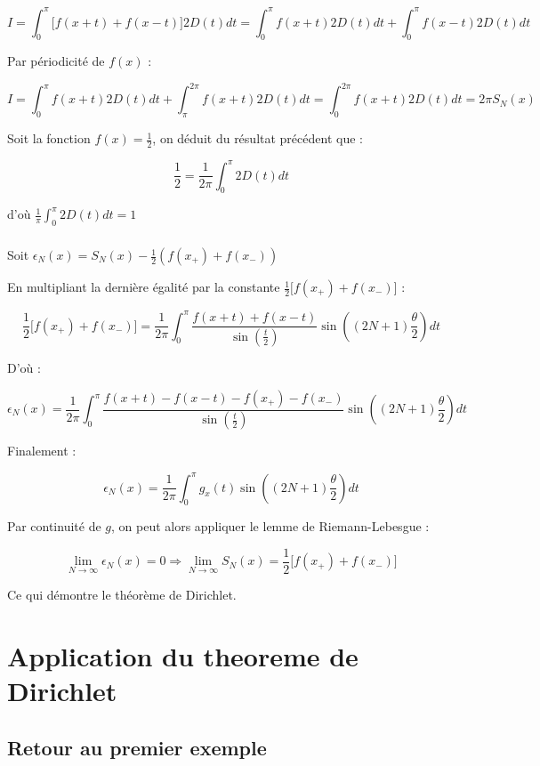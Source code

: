\documentclass{article}
\begin{document}
$$I = \int_{0}^{\pi} \Big[f(x + t) + f(x - t)\Big] 2D(t) dt = \int_{0}^{\pi} f(x + t) 2D(t) dt
+ \int_{0}^{\pi} f(x - t) 2D(t) dt$$

Par périodicité de $f(x)$ :

$$I = \int_{0}^{\pi} f(x + t) 2D(t) dt + \int_{\pi}^{2\pi} f(x + t) 2D(t) dt =
\int_{0}^{2\pi} f(x + t) 2D(t) dt = 2\pi S_N(x)$$ 

Soit la fonction $f(x) = \frac{1}{2}$, on déduit du résultat précédent que :

$$\frac{1}{2} = \frac{1}{2\pi} \int_{0}^{\pi} 2 D(t) dt$$

d'où $\frac{1}{\pi} \int_{0}^{\pi} 2 D(t) dt = 1$

\subsubsection{}

Soit $\epsilon_N(x) = S_N(x) - \frac{1}{2}(f(x_{+}) + f(x_{-}))$

En multipliant la dernière égalité par la constante $\frac{1}{2}\Big[f(x_{+}) + f(x_{-})\Big]$ :

$$\frac{1}{2}\Big[f(x_{+}) + f(x_{-})\Big] =
\frac{1}{2\pi} \int_{0}^{\pi} \frac{f(x + t) + f(x - t)}{\sin(\frac{t}{2})} \sin((2N + 1)\frac{\theta}{2}) dt$$


D'où :

$$\epsilon_N(x) = \frac{1}{2\pi} \int_{0}^{\pi} 
\frac{f(x + t) - f(x - t) - f(x_{+}) - f(x_{-})}{\sin(\frac{t}{2})} \sin((2N + 1)\frac{\theta}{2}) dt$$

Finalement :

$$\epsilon_N(x) = \frac{1}{2\pi} \int_{0}^{\pi} g_{x}(t) \sin((2N + 1)\frac{\theta}{2}) dt$$

Par continuité de $g$, on peut alors appliquer le lemme de Riemann-Lebesgue :

$$\lim_{N \to \infty} \epsilon_N(x) = 0 \Rightarrow \lim_{N \to \infty} S_N(x) = \frac{1}{2}\Big[f(x_{+}) + f(x_{-})\Big]$$

Ce qui démontre le théorème de Dirichlet.

\section{Application du theoreme de Dirichlet}

\subsection{Retour au premier exemple}
\end{document}
